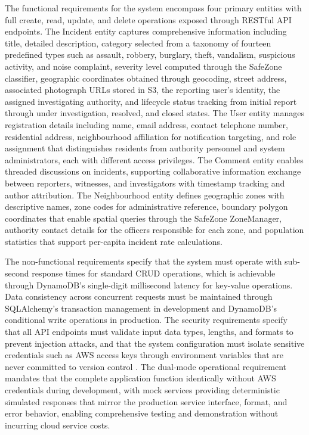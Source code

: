 \documentclass[conference]{IEEEtran}
\begin{document}
The functional requirements for the system encompass four primary entities with full create, read, update, and delete operations exposed through RESTful API endpoints. The Incident entity captures comprehensive information including title, detailed description, category selected from a taxonomy of fourteen predefined types such as assault, robbery, burglary, theft, vandalism, suspicious activity, and noise complaint, severity level computed through the SafeZone classifier, geographic coordinates obtained through geocoding, street address, associated photograph URLs stored in S3, the reporting user's identity, the assigned investigating authority, and lifecycle status tracking from initial report through under investigation, resolved, and closed states. The User entity manages registration details including name, email address, contact telephone number, residential address, neighbourhood affiliation for notification targeting, and role assignment that distinguishes residents from authority personnel and system administrators, each with different access privileges. The Comment entity enables threaded discussions on incidents, supporting collaborative information exchange between reporters, witnesses, and investigators with timestamp tracking and author attribution. The Neighbourhood entity defines geographic zones with descriptive names, zone codes for administrative reference, boundary polygon coordinates that enable spatial queries through the SafeZone ZoneManager, authority contact details for the officers responsible for each zone, and population statistics that support per-capita incident rate calculations.

The non-functional requirements specify that the system must operate with sub-second response times for standard CRUD operations, which is achievable through DynamoDB's single-digit millisecond latency for key-value operations. Data consistency across concurrent requests must be maintained through SQLAlchemy's transaction management in development and DynamoDB's conditional write operations in production. The security requirements specify that all API endpoints must validate input data types, lengths, and formats to prevent injection attacks, and that the system configuration must isolate sensitive credentials such as AWS access keys through environment variables that are never committed to version control \cite{newman2015microservices}. The dual-mode operational requirement mandates that the complete application function identically without AWS credentials during development, with mock services providing deterministic simulated responses that mirror the production service interface, format, and error behavior, enabling comprehensive testing and demonstration without incurring cloud service costs.
\end{document}
